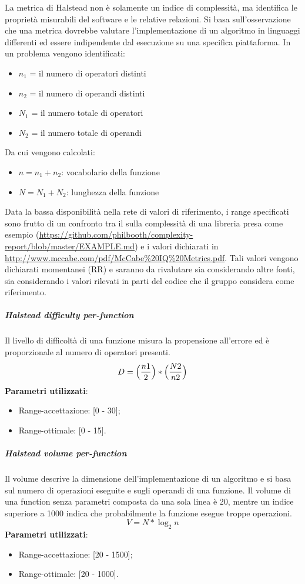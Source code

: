 			La metrica di Halstead non è solamente un indice di complessità, ma identifica le proprietà misurabili del software e le relative relazioni.
			Si basa sull'osservazione che una metrica dovrebbe valutare l'implementazione di un algoritmo in linguaggi differenti ed essere indipendente dal esecuzione su una specifica piattaforma.
			In un problema vengono identificati:
			\begin{itemize}
				\item $n_1$ = il numero di operatori distinti
				\item $n_2$ = il numero di operandi distinti
				\item $N_1$ = il numero totale di operatori
				\item $N_2$ = il numero totale di operandi
			\end{itemize}
			Da cui vengono calcolati:
				\begin{itemize}
				\item $n = n_1 + n_2$: vocabolario della funzione
				\item $N = N_1 + N_2$: lunghezza della funzione
			\end{itemize}
			Data la bassa disponibilità nella rete di valori di riferimento, i range specificati sono frutto di un confronto tra il  sulla complessità di una libreria  presa come esempio (\url{https://github.com/philbooth/complexity-report/blob/master/EXAMPLE.md}) e i valori dichiarati in \url{http://www.mccabe.com/pdf/McCabe\%20IQ\%20Metrics.pdf}. Tali valori vengono dichiarati momentanei (RR) e saranno da rivalutare sia considerando altre fonti, sia considerando i valori rilevati in parti del codice che il gruppo considera come riferimento. %

			
			\subparagraph{Halstead difficulty per-function}
			Il livello di difficoltà di una funzione misura la propensione all'errore ed è proporzionale al numero di operatori presenti. 
			\[
			 D = \Bigl( \frac{n1}{2} \Bigr)  * \Bigl(  \frac{N2}{n2} \Bigr)
			 \]
			\textbf{Parametri utilizzati}:
			\begin{itemize}
				\item Range-accettazione: [0 - 30];
				\item Range-ottimale: [0 - 15].
			\end{itemize}
			
			\subparagraph{Halstead volume per-function}
			Il volume descrive la dimensione dell'implementazione di un algoritmo e si basa sul numero di operazioni eseguite e sugli operandi di una funzione. Il volume di una function senza parametri composta da una sola linea è 20, mentre un indice superiore a 1000 indica che probabilmente la funzione esegue troppe operazioni.
			\[
			 V = N * \log_{2}n
			\]
			\textbf{Parametri utilizzati}:
			\begin{itemize}
				\item Range-accettazione: [20 - 1500];
				\item Range-ottimale: [20 - 1000].
			\end{itemize}

